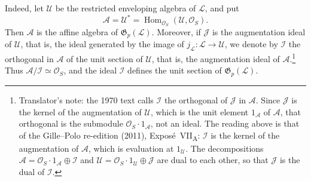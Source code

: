 Indeed, let \(\mathcal U\) be the restricted enveloping algebra of
\(\mathcal L\), and put
\[
  \mathcal A=\mathcal U^{*}
  =\operatorname{Hom}_{\mathcal O_S}(\mathcal U,\mathcal O_S).
\]
Then \(\mathcal A\) is the affine algebra of
\(\mathfrak G_p(\mathcal L)\). Moreover, if \(\mathcal J\) is the
augmentation ideal of \(\mathcal U\), that is, the ideal generated by the
image of \(j_{\mathcal L}:\mathcal L\to\mathcal U\), we denote by
\(\mathcal I\) the orthogonal in \(\mathcal A\) of the unit section of
\(\mathcal U\), that is, the augmentation ideal of
\(\mathcal A\).\footnote{Translator's note: the 1970 text calls
\(\mathcal I\) the orthogonal of \(\mathcal J\) in \(\mathcal A\). Since
\(\mathcal J\) is the kernel of the augmentation of \(\mathcal U\), which
is the unit element \(1_{\mathcal A}\) of \(\mathcal A\), that orthogonal
is the submodule \(\mathcal O_S\cdot1_{\mathcal A}\), not an ideal. The
reading above is that of the Gille--Polo re-edition (2011),
Expos\'e~VII\textsubscript{A}: \(\mathcal I\) is the kernel of the
augmentation of \(\mathcal A\), which is evaluation at
\(1_{\mathcal U}\). The decompositions
\(\mathcal A=\mathcal O_S\cdot1_{\mathcal A}\oplus\mathcal I\) and
\(\mathcal U=\mathcal O_S\cdot1_{\mathcal U}\oplus\mathcal J\) are dual to
each other, so that \(\mathcal J\) is the dual of \(\mathcal I\).} Thus
\(\mathcal A/\mathcal I\simeq\mathcal O_S\), and the ideal \(\mathcal I\)
defines the unit section of \(\mathfrak G_p(\mathcal L)\).

